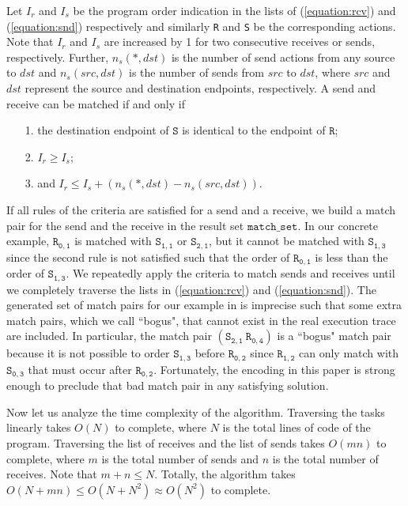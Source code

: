Let $I_r$ and $I_s$ be the program order indication in the lists of (\ref{equation:rcv}) and (\ref{equation:snd}) respectively and similarly \texttt{R} and \texttt{S} be the corresponding actions. Note that $I_r$ and $I_s$ are increased by 1 for two consecutive receives or sends, respectively. Further, $n_s(*,\mathit{dst})$ is the number of send actions from any source to $\mathit{dst}$ and $n_s(\mathit{src},\mathit{dst})$ is the number of sends from $\mathit{src}$ to $\mathit{dst}$, where $\mathit{src}$ and $\mathit{dst}$ represent the source and destination endpoints, respectively. A send and receive can be matched if and only if
\begin{itemize}
\item[1.] the destination endpoint of $\mathtt{S}$ is identical to the endpoint of $\mathtt{R}$;
\item[2.] $I_r \geq I_s$;
\item[3.] and $I_r \leq I_s + (n_s(*,\mathit{dst}) - n_s(\mathit{src},\mathit{dst}))$.
\end{itemize}
If all rules of the criteria are satisfied for a send and a receive, we build a match pair for the send and the receive in the result set $\mathtt{match\_set}$. In our concrete example, $\mathtt{R_{0,1}}$ is matched with $\mathtt{S_{1,1}}$ or $\mathtt{S_{2,1}}$, but it cannot be matched with $\mathtt{S_{1,3}}$ since the second rule is not satisfied such that the order of $\mathtt{R_{0,1}}$ is less than the order of $\mathtt{S_{1,3}}$. We repeatedly apply the criteria to match sends and receives until we completely traverse the lists in (\ref{equation:rcv}) and (\ref{equation:snd}). The generated set of match pairs for our example in  is imprecise such that some extra match pairs, which we call ``bogus", that cannot exist in the real execution trace are included. In particular, the match pair $(\mathtt{S_{2,1}}\ \mathtt{R_{0,4}})$ is a ``bogus" match pair because it is not possible to order $\mathtt{S_{1,3}}$ before $\mathtt{R_{0,2}}$ since $\mathtt{R_{1,2}}$ can only match with $\mathtt{S_{0,3}}$ that must occur after $\mathtt{R_{0,2}}$. Fortunately, the encoding in this paper is strong enough to preclude that bad match pair in any satisfying solution.


Now let us analyze the time complexity of the algorithm. Traversing the tasks linearly takes $O(N)$ to complete, where $N$ is the total lines of code of the program. Traversing the list of receives and the list of sends takes $O(mn)$ to complete, where $m$ is the total number of sends and $n$ is the total number of receives. Note that $m + n \le N$. Totally, the algorithm takes $O(N + mn) \leq O(N + N^2) \approx O(N^2)$ to complete.

